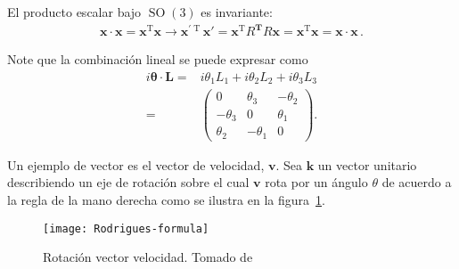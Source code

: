 \begin{frame}
El producto escalar bajo $\operatorname{SO}(3)$ es invariante:
\begin{align}
  \label{eq:psso3}
  \boldsymbol{x}\cdot \boldsymbol{x}= \boldsymbol{x}^{\operatorname{T}} \boldsymbol{x}\to \boldsymbol{x}^{\prime\operatorname{T}} \boldsymbol{x}'
  =\boldsymbol{x}^{\operatorname{T}}R^{\boldsymbol{T}} R \boldsymbol{x}=\boldsymbol{x}^{\operatorname{T}} \boldsymbol{x}=  \boldsymbol{x}\cdot \boldsymbol{x}\,.
\end{align}
\end{frame}

Note que la combinación lineal se puede expresar como
\begin{align}
  i\boldsymbol{\theta}\cdot\boldsymbol{L}=& i\theta_1 L_1+i\theta_2 L_2+i\theta_3 L_3 \nonumber\\
=&   \begin{pmatrix}
  0           & \theta_3 & -\theta_2 \\
  -\theta_3   &  0       & \theta_1 \\
  \theta_2    & -\theta_1 & 0
   \end{pmatrix}.
\end{align}

Un ejemplo de vector es el vector de velocidad, $\boldsymbol{v}$. Sea $\boldsymbol{k}$ un vector unitario describiendo un eje de rotación sobre el cual $\boldsymbol{v}$ rota por un ángulo $\theta$ de acuerdo a la regla de la mano derecha como se ilustra en la figura~\ref{fig:rf}.
\begin{figure}
  \centering
  \texttt{[image: Rodrigues-formula]}
  \caption{Rotación vector velocidad. Tomado de \cite{rodriguez}}
  \label{fig:rf}
\end{figure}

